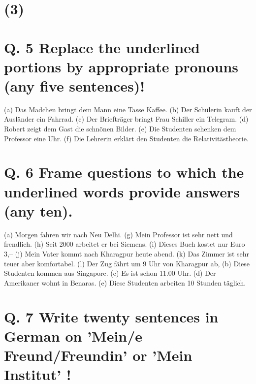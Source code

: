 \documentclass{article}
\begin{document}
\section*{(3)}
\section*{Q. 5 Replace the underlined portions by appropriate pronouns (any five sentences)!}
(a) Das Madchen bringt dem Mann eine Tasse Kaffee.
(b) Der Schülerin kauft der Ausländer ein Fahrrad.
(c) Der Briefträger bringt Frau Schiller ein Telegram.
(d) Robert zeigt dem Gast die schnönen Bilder.
(e) Die Studenten schenken dem Professor eine Uhr.
(f) Die Lehrerin erklärt den Studenten die Relativitästheorie.
\section*{Q. 6 Frame questions to which the underlined words provide answers (any ten).}
(a) Morgen fahren wir nach Neu Delhi.
(g) Mein Professor ist sehr nett und frendlich.
(h) Seit 2000 arbeitet er bei Siemens.
(i) Dieses Buch kostet nur Euro 3,--
(j) Mein Vater kommt nach Kharagpur heute abend.
(k) Das Zimmer ist sehr teuer aber komfortabel.
(l) Der Zug fährt um 9 Uhr von Kharagpur ab,
(b) Diese Studenten kommen aus Singapore.
(c) Es ist schon 11.00 Uhr.
(d) Der Amerikaner wohnt in Benaras.
(e) Diese Studenten arbeiten 10 Stunden täglich.
\section*{Q. 7 Write twenty sentences in German on 'Mein/e Freund/Freundin' or 'Mein Institut' !}
\end{document}
